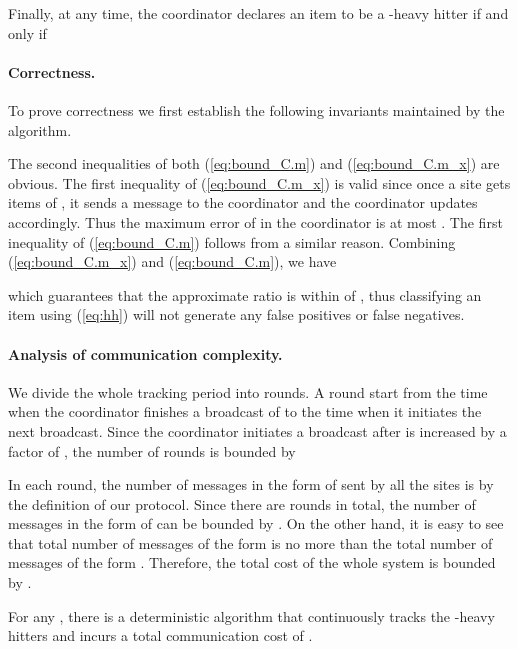 \documentclass[10pt]{article}
\begin{document}
Finally, at any time, the coordinator  declares an item  to be a
-heavy hitter if and only if



\paragraph{Correctness.}
To prove correctness we first establish the following invariants
maintained by the algorithm.



The second inequalities of both (\ref{eq:bound_C.m}) and
(\ref{eq:bound_C.m_x}) are obvious. The first inequality of
(\ref{eq:bound_C.m_x}) is valid since once a site  gets
 items of , it sends a message to the
coordinator and the coordinator updates  accordingly. Thus
the maximum error of  in the coordinator is at most
. The first inequality of (\ref{eq:bound_C.m}) follows
from a similar reason. Combining (\ref{eq:bound_C.m_x}) and
(\ref{eq:bound_C.m}), we have

which guarantees that the approximate ratio  is within
 of , thus classifying an item using (\ref{eq:hh})
will not generate any false positives or false negatives.

\paragraph{Analysis of communication complexity.}
We divide the whole tracking period into rounds. A round start
from the time when the coordinator finishes a broadcast of  to the
time when it initiates the next broadcast. Since the coordinator
initiates a broadcast after  is increased by a factor of
, the number of rounds is
bounded by



In each round, the number of messages in the form of  sent by all the sites is  by the definition of our
protocol. Since there are  rounds in total, the number of
messages in the form of  can be bounded by
. On the other hand, it is easy to see that total
number of messages of the form  is no more than
the total number of messages of the form .
Therefore, the total cost of the whole system is bounded by
.


\begin{theorem}
For any , there is a deterministic algorithm that
  continuously tracks the -heavy hitters and incurs a total
  communication cost of 
  .
\end{theorem}
\end{document}
